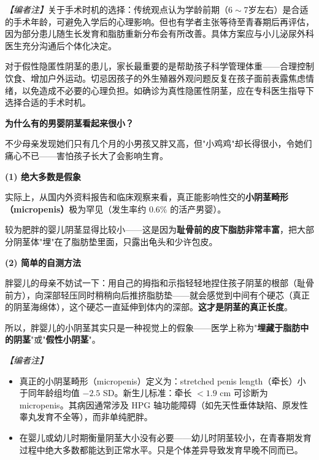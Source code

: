 \noindent\textit{【编者注】}关于手术时机的选择：传统观点认为学龄前期（$6\sim7$岁左右）是合适的手术年龄，可避免入学后的心理影响。但也有学者主张等待至青春期后再评估，因为部分患儿随生长发育和脂肪重新分布会有所改善。具体方案应与小儿泌尿外科医生充分沟通后个体化决定。

\begin{tcolorbox}[colback=pink!5!white,colframe=red!50!black,title=贴心小叮咛]
对于假性隐匿性阴茎的患儿，家长最重要的是帮助孩子科学管理体重——合理控制饮食、增加户外运动。切忌因孩子的外生殖器外观问题反复在孩子面前表露焦虑情绪，以免造成不必要的心理负担。如确诊为真性隐匿性阴茎，应在专科医生指导下选择合适的手术时机。
\end{tcolorbox}

\vspace{0.8em}
\noindent\textbf{为什么有的男婴阴茎看起来很小？}

不少母亲发现她们只有几个月的小男孩又胖又高，但"小鸡鸡"却长得很小，令她们痛心不已——害怕孩子长大了会影响生育。

\vspace{0.5em}
\noindent\textbf{(1) 绝大多数是假象}

实际上，从国内外资料报告和临床观察来看，真正能影响性交的\textbf{小阴茎畸形（micropenis）}极为罕见（发生率约 $0.6\%$ 的活产男婴）。

较为肥胖的婴儿阴茎显得比较小——这是因为\textbf{耻骨前的皮下脂肪非常丰富}，把大部分阴茎体"埋"在了脂肪垫里面，只露出龟头和少许包皮。

\vspace{0.3em}
\noindent\textbf{(2) 简单的自测方法}

胖婴儿的母亲不妨试一下：用自己的拇指和示指轻轻地捏住孩子阴茎的根部（耻骨前方），向深部轻压同时稍稍向后推挤脂肪垫——就会感觉到中间有个硬芯（真正的阴茎海绵体），这个硬芯一直延伸到体内的深部。\textbf{这才是阴茎的真正长度}。

所以，胖婴儿的小阴茎其实只是一种视觉上的假象——医学上称为"\textbf{埋藏于脂肪中的阴茎}"或"\textbf{假性小阴茎}"。

\vspace{0.3em}
\noindent\textit{【编者注】}
\begin{itemize}
	\item 真正的小阴茎畸形（micropenis）定义为：stretched penis length（牵长）小于同年龄组均值 $-2.5$ SD。新生儿标准：牵长 $< 1.9$ cm 可诊断为 micropenis。其病因通常涉及 HPG 轴功能障碍（如先天性垂体缺陷、原发性睾丸发育不全等），而非单纯肥胖。
	\item 在婴儿或幼儿时期衡量阴茎大小没有必要——幼儿时阴茎较小，在青春期发育过程中绝大多数都能达到正常水平。只是个体差异导致发育早晚不同而已。
\end{itemize}

